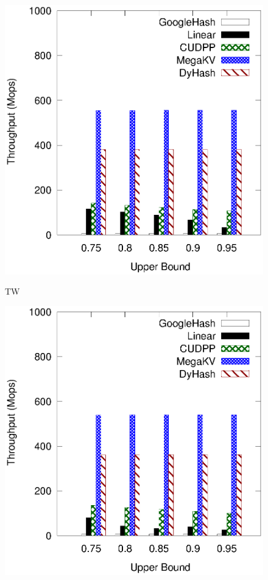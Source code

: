 \begin{figure}[h]
	\begin{minipage}{0.19\linewidth}\centering
		\includegraphics[width=\linewidth]{pic/static-upper/upper_search_twitter.eps}
		\centerline{TW}
	\end{minipage}
	\hfill
	\begin{minipage}{0.19\linewidth}\centering
		\includegraphics[width=\linewidth]{pic/static-upper/upper_search_reddit.eps}

\end{minipage}
\end{figure}
